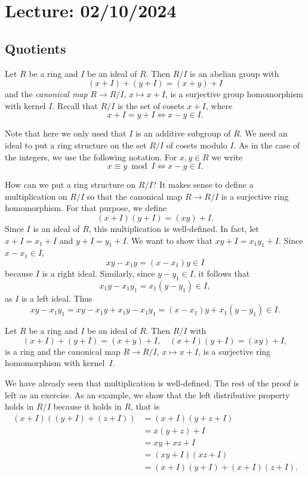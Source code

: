 \section{Lecture: 02/10/2024}

\subsection{Quotients}

Let $R$ be a ring and $I$ be an ideal of $R$. 
Then $R/I$ is an abelian group
with 
\[
(x+I)+(y+I)=(x+y)+I
\]
and the 
\emph{canonical map} 
$R\to R/I$, $x\mapsto x+I$,
is a surjective group homomorphism with kernel $I$. Recall that 
$R/I$ is the set of cosets $x+I$, where 
\[
x+I=y+I\Longleftrightarrow x-y\in I.
\]

Note that here we only used
that $I$ is an additive subgroup of $R$. We need an ideal to put a ring structure
on the set $R/I$ of cosets modulo $I$. As in the case of the integers, 
we use the following notation. For $x,y\in R$ 
we write 
\[
x\equiv y\bmod I\Longleftrightarrow x-y\in I.
\]

How can we put a ring structure on $R/I$? It makes sense
to define a multiplication on $R/I$ so that
the canonical map $R\to R/I$ is a surjective ring homomorphism. For that purpose, 
we define 
\[
(x+I)(y+I)=(xy)+I.
\]
Since $I$ is an ideal of $R$, this multiplication is well-defined. In fact, let 
$x+I=x_1+I$ and $y+I=y_1+I$. We want to show that
$xy+I=x_1y_1+I$. Since $x-x_1\in I$, 
\[
xy-x_1y=(x-x_1)y\in I
\]
because $I$ is a right ideal. Similarly, since $y-y_1\in I$, it follows that 
\[
x_1y-x_1y_1=x_1(y-y_1)\in I,
\]
as $I$ is a left ideal. Thus
\[
xy-x_1y_1=xy-x_1y+x_1y-x_1y_1=(x-x_1)y+x_1(y-y_1)\in I.
\]

\begin{theorem}
\label{thm:quotient_ring}
	Let $R$ be a ring and $I$ be an ideal of $R$. Then
	$R/I$ with 
	\[
	(x+I)+(y+I)=(x+y)+I,\quad
	(x+I)(y+I)=(xy)+I,
	\]
	is a ring and the canonical map $R\to R/I$, $x\mapsto x+I$, 
	is a surjective ring homomorphism with kernel~$I$. 
\end{theorem}

We have already seen that multiplication is well-defined. 
The rest of the proof is left as an exercise. As an example, we show that 
the left distributive property holds
in $R/I$ because it holds in $R$, that is 
\begin{align*}
    (x+I)\left((y+I)+(z+I)\right) &= (x+I)(y+z+I)\\
    &=x(y+z)+I\\
    &=xy+xz+I\\
    &=(xy+I)(xz+I)\\
    &=(x+I)(y+I)+(x+I)(z+I).
\end{align*}

